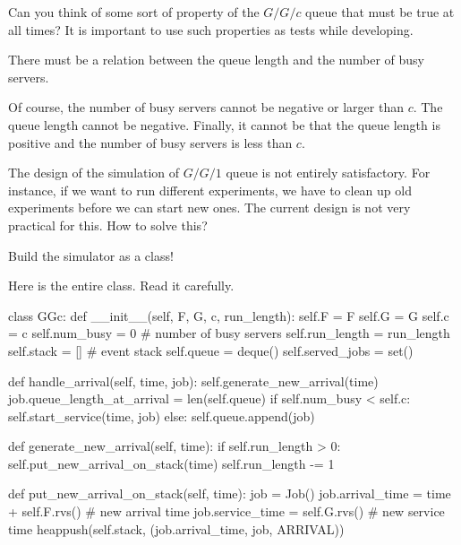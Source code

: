 \documentclass{scrartcl}
\begin{document}
\begin{exercise}
  Can you think of some sort of property of the $G/G/c$ queue that must be true at all times? It is important to use such properties  as tests while developing.
  \hintsymbol\begin{hint}
    There must be a relation between the queue length and the number of busy servers.
  \end{hint}
  \begin{solution}
    Of course, the number of busy servers cannot be negative or larger than $c$. The queue length cannot be negative. Finally, it cannot be that  the queue length is positive and the number of busy servers is less than $c$. 
  \end{solution}
\end{exercise}

\begin{exercise}
The design of the simulation of $G/G/1$ queue is not entirely satisfactory. For instance, if we want to run different experiments, we have to clean up old experiments before we can start new ones. The current design is not very practical for this. How to solve this?

\hintsymbol\begin{hint}
     Build the simulator as a class!
\end{hint}
\begin{solution}
Here is the entire class. Read it carefully.   


\begin{pyblock}
class GGc:
    def __init__(self, F, G, c, run_length):
        self.F = F
        self.G = G
        self.c = c
        self.num_busy = 0   # number of busy servers
        self.run_length = run_length
        self.stack = [] # event stack
        self.queue = deque()
        self.served_jobs = set()

    def handle_arrival(self, time, job):
        self.generate_new_arrival(time)
        job.queue_length_at_arrival = len(self.queue)
        if self.num_busy < self.c:
            self.start_service(time, job)
        else:
            self.queue.append(job)

    def generate_new_arrival(self, time):
        if self.run_length > 0:
            self.put_new_arrival_on_stack(time)
            self.run_length -= 1

    def put_new_arrival_on_stack(self, time):
        job = Job()
        job.arrival_time = time + self.F.rvs()  # new arrival time
        job.service_time = self.G.rvs()  # new service time
        heappush(self.stack, (job.arrival_time, job, ARRIVAL))


\end{pyblock}
\end{solution}
\end{exercise}
\end{document}
